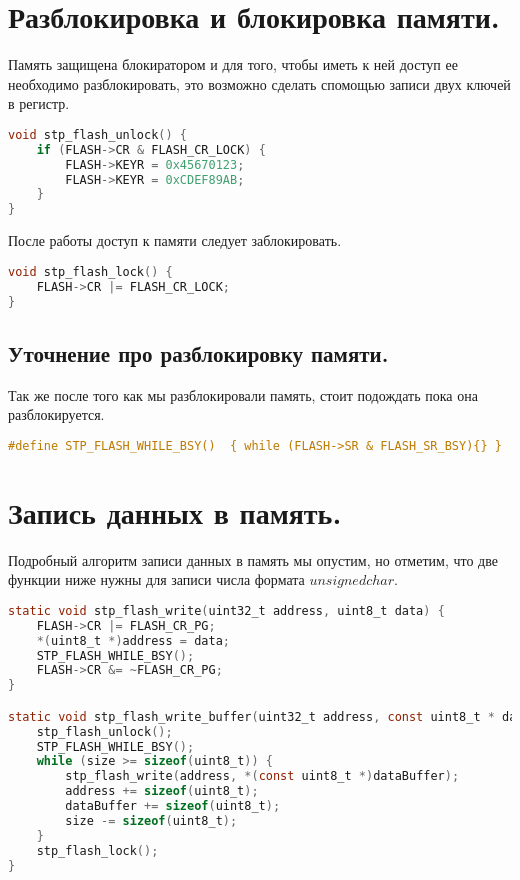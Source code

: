 \documentclass{bmstu}
\begin{document}
	\section{Разблокировка и блокировка памяти.}
	
	Память защищена блокиратором и для того, чтобы иметь к ней доступ ее необходимо разблокировать, это возможно сделать спомощью записи двух ключей в регистр.

	\begingroup
	\fontsize{12pt}{12pt}\selectfont
	\begin{lstlisting}[language=C]
void stp_flash_unlock() {
	if (FLASH->CR & FLASH_CR_LOCK) {
		FLASH->KEYR = 0x45670123;
		FLASH->KEYR = 0xCDEF89AB;
	}
}
	\end{lstlisting}
	\endgroup

	После работы доступ к памяти следует заблокировать.

	\begingroup
	\fontsize{12pt}{12pt}\selectfont
	\begin{lstlisting}[language=C]
void stp_flash_lock() {
	FLASH->CR |= FLASH_CR_LOCK;
}
	\end{lstlisting}
	\endgroup
	
	\subsection{Уточнение про разблокировку памяти.}
	
	Так же после того как мы разблокировали память, стоит подождать пока она разблокируется.
	
	\begingroup
	\fontsize{12pt}{12pt}\selectfont
	\begin{lstlisting}[language=C]
#define STP_FLASH_WHILE_BSY()  { while (FLASH->SR & FLASH_SR_BSY){} }
	\end{lstlisting}
	\endgroup
	
	
	\section{Запись данных в память.}
	
	Подробный алгоритм записи данных в память мы опустим, но отметим, что две функции ниже нужны для записи числа формата $unsigned char$.
	
	\begingroup
	\fontsize{12pt}{12pt}\selectfont
	\begin{lstlisting}[language=C]
static void stp_flash_write(uint32_t address, uint8_t data) {
	FLASH->CR |= FLASH_CR_PG;
	*(uint8_t *)address = data;
	STP_FLASH_WHILE_BSY();
	FLASH->CR &= ~FLASH_CR_PG;
}

static void stp_flash_write_buffer(uint32_t address, const uint8_t * dataBuffer, uint32_t size) {
	stp_flash_unlock();
	STP_FLASH_WHILE_BSY();
	while (size >= sizeof(uint8_t)) {
		stp_flash_write(address, *(const uint8_t *)dataBuffer);
		address += sizeof(uint8_t);
		dataBuffer += sizeof(uint8_t);
		size -= sizeof(uint8_t);
	}
	stp_flash_lock();
}
	\end{lstlisting}
	\endgroup
	
\end{document}
